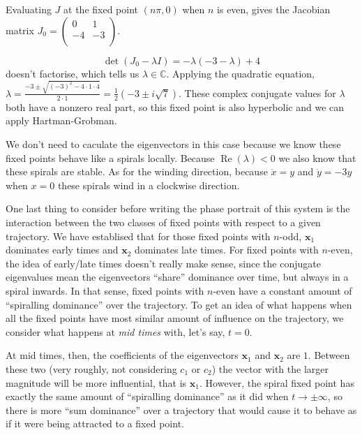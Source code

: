 \documentclass[10pt]{article}
\begin{document}
\begin{enumerate}
      Evaluating $J$ at the fixed point $(n\pi,0)$ when $n$ is even, gives the
      Jacobian matrix
        $
          J_0 = \begin{pmatrix}
            0 & 1 \\
            -4 & -3 \\
          \end{pmatrix}
        $.

        $$\det(J_0 - \lambda I) = -\lambda(-3-\lambda) + 4$$ doesn't
        factorise, which tells us $\lambda \in \mathbb{C}$. Applying the
        quadratic equation,
        $\lambda = \frac{-3\pm\sqrt{(-3)^2-4\cdot 1 \cdot 4}}{2 \cdot 1} = \tfrac{1}{2}(-3 \pm i\sqrt{7})$.
        These complex conjugate values for $\lambda$ both have a nonzero real
        part, so this fixed point is also hyperbolic and we can apply
        Hartman-Grobman.

        We don't need to caculate the eigenvectors in this case because we know
        these fixed points behave like a spirals locally. Because
        $\operatorname{Re}(\lambda) < 0$ we also know that these spirals are
        stable. As for the winding direction, because $\dot x = y$ and $\dot y
        = -3y$ when $x = 0$ these spirals wind in a clockwise direction.

        \pagebreak

        One last thing to consider before writing the phase portrait of this
        system is the interaction between the two classes of fixed points with
        respect to a given trajectory. We have establised that for those fixed
        points with $n$-odd, $\mathbf{x}_1$ dominates early times and
        $\mathbf{x}_2$ dominates late times. For fixed points with $n$-even,
        the idea of early/late times doesn't really make sense, since the
        conjugate eigenvalues mean the eigenvectors ``share'' dominance over
        time, but always in a spiral inwards. In that sense, fixed points with
        $n$-even have a constant amount of ``spiralling dominance'' over the
        trajectory. To get an idea of what happens when all the fixed points
        have most similar amount of influence on the trajectory, we consider
        what happens at \emph{mid times} with, let's say, $t=0$.

        At mid times, then, the coefficients of the eigenvectors $\mathbf{x}_1$
        and $\mathbf{x}_2$ are $1$. Between these two (very roughly, not
        considering $c_1$ or $c_2$) the vector with the larger magnitude will
        be more influential, that is $\mathbf{x}_1$. However, the spiral fixed
        point has exactly the same amount of ``spiralling dominance'' as it did
        when $t \rightarrow \pm \infty$, so there is more ``sum dominance''
        over a trajectory that would cause it to behave as if it were being
        attracted to a fixed point.


\end{enumerate}
\end{document}
